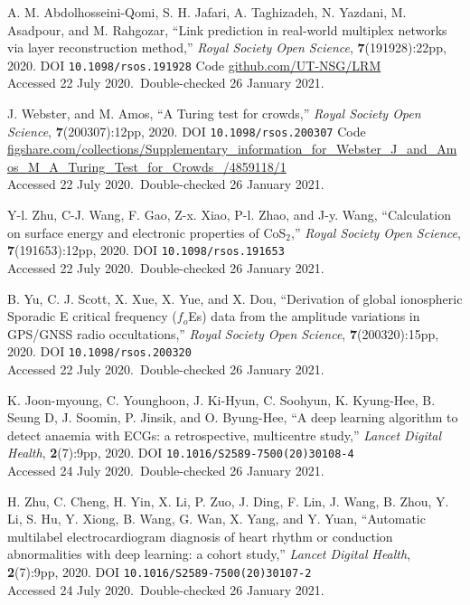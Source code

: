 \vbox{
{\sc A. M. Abdolhosseini-Qomi, S. H. Jafari, A. Taghizadeh, N. Yazdani, M. Asadpour, and M. Rahgozar}, ``Link prediction in real-world multiplex networks via layer reconstruction method,'' \emph{Royal Society Open Science}, \textbf{7}(191928):22pp, 2020. DOI \texttt{10.1098/rsos.191928} {Code \url{github.com/UT-NSG/LRM}}\\\hfill{Accessed 22 July 2020.}\ {Double-checked 26 January 2021}.}\bibskip

\vbox{
{\sc J. Webster, and M. Amos}, ``A Turing test for crowds,'' \emph{Royal Society Open Science}, \textbf{7}(200307):12pp, 2020. DOI \texttt{10.1098/rsos.200307} {Code \url{figshare.com/collections/Supplementary_information_for_Webster_J_and_Amos_M_A_Turing_Test_for_Crowds_/4859118/1}}\\\hfill{Accessed 22 July 2020.}\ {Double-checked 26 January 2021}.}\bibskip

\vbox{
{\sc Y-l. Zhu, C-J. Wang, F. Gao, Z-x. Xiao, P-l. Zhao, and J-y. Wang}, ``Calculation on surface energy and electronic properties of CoS${}_2$,'' \emph{Royal Society Open Science}, \textbf{7}(191653):12pp, 2020. DOI \texttt{10.1098/rsos.191653}\\\hfill{Accessed 22 July 2020.}\ {Double-checked 26 January 2021}.}\bibskip

\vbox{
{\sc B. Yu, C. J. Scott, X. Xue, X. Yue, and X. Dou}, ``Derivation of global ionospheric Sporadic E critical frequency ($f_o$Es) data from the amplitude variations in GPS/GNSS radio occultations,'' \emph{Royal Society Open Science}, \textbf{7}(200320):15pp, 2020. DOI \texttt{10.1098/rsos.200320}\\\hfill{Accessed 22 July 2020.}\ {Double-checked 26 January 2021}.}\bibskip

\vbox{
{\sc K. Joon-myoung, C. Younghoon, J. Ki-Hyun, C. Soohyun, K. Kyung-Hee, B. Seung D, J. Soomin, P. Jinsik, and O. Byung-Hee}, ``A deep learning algorithm to detect anaemia with ECGs: a retrospective, multicentre study,'' \emph{Lancet Digital Health}, \textbf{2}(7):9pp, 2020. DOI \texttt{10.1016/S2589-7500(20)30108-4}\\\hfill{Accessed 24 July 2020.}\ {Double-checked 26 January 2021}.}\bibskip

\vbox{
{\sc H. Zhu, C. Cheng, H. Yin, X. Li, P. Zuo, J. Ding, F. Lin, J. Wang, B. Zhou, Y. Li, S. Hu, Y. Xiong, B. Wang, G. Wan, X. Yang, and Y. Yuan}, ``Automatic multilabel electrocardiogram diagnosis of heart rhythm or conduction abnormalities with deep learning: a cohort study,'' \emph{Lancet Digital Health}, \textbf{2}(7):9pp, 2020. DOI \texttt{10.1016/S2589-7500(20)30107-2}\\\hfill{Accessed 24 July 2020.}\ {Double-checked 26 January 2021}.}\bibskip

